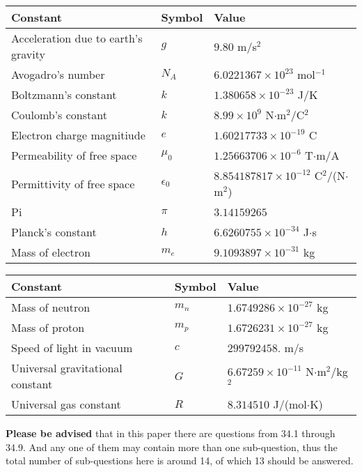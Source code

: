 \documentclass[12pt]{article}
\begin{document}
\noindent\begin{tabular}{|l|l|l|}
\hline
Constant & Symbol & Value \\
\hline
Acceleration due to earth's gravity &
$g$ &
 $ 9.80 $
m/s$^2$ \\
\hline
Avogadro's number &
$N_A$ &
 $ 6.0221367 \times 10^{23} $
mol$^{-1}$ \\
\hline
Boltzmann's constant &
$k$ &
 $ 1.380658 \times 10^{-23} $
J/K \\
\hline
Coulomb's constant &
$k$ &
 $ 8.99 \times 10^{9} $
N$\cdot $m$^2$/C$^2$ \\
\hline
Electron charge magnitiude &
$e$ &
 $ 1.60217733 \times 10^{-19} $
C \\
\hline
Permeability of free space &
$\mu _0$ &
 $ 1.25663706 \times 10^{-6} $
T$\cdot $m/A \\
\hline
Permittivity of free space &
$\epsilon _0$ &
 $ 8.854187817 \times 10^{-12} $
C$^2$/(N$\cdot $m$^2$) \\
\hline
Pi &
$\pi$ &
 $ 3.14159265 $
$ $ \\
\hline
Planck's constant &
$h$ &
 $ 6.6260755 \times 10^{-34} $
J$\cdot $s \\
\hline
Mass of electron &
$m_e$ &
 $ 9.1093897 \times 10^{-31} $
kg \\
\hline
\end{tabular}
 
 
\noindent\begin{tabular}{|l|l|l|}
\hline
Constant & Symbol & Value \\
\hline
Mass of neutron &
$m_n$ &
 $ 1.6749286 \times 10^{-27} $
kg \\
\hline
Mass of proton &
$m_p$ &
 $ 1.6726231 \times 10^{-27} $
kg \\
\hline
Speed of light in vacuum &
$c$ &
 $ 299792458. $
m/s \\
\hline
Universal gravitational constant &
$G$ &
 $ 6.67259 \times 10^{-11} $
N$\cdot $m$^2$/kg$^2$ \\
\hline
Universal gas constant &
$R$ &
 $ 8.314510 $
J/(mol$\cdot $K) \\
\hline
\end{tabular}
 
 
{\textbf{\large{Please be advised}}} that in this paper there are questions from
34.1 through
34.9.
And any one of them may contain more than one sub-question, thus the total number
of sub-questions here is around 14, of which
13 should be answered.
 
\vspace{0.3in}
 
\end{document}
